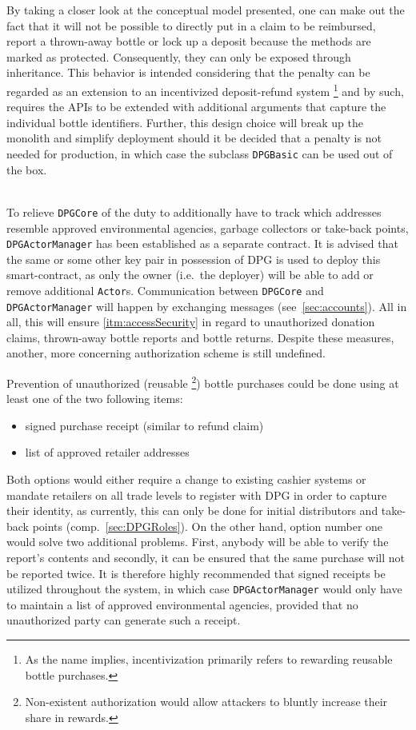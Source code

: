 \begin{description}[format={\storedescriptionlabel}]
	By taking a closer look at the conceptual model presented, one can make out the fact that it will not be possible to directly put in a claim to be reimbursed, report a thrown-away bottle or lock up a deposit because the methods are marked as protected. Consequently, they can only be exposed through inheritance. This behavior is intended considering that the penalty can be regarded as an extension to an incentivized deposit-refund system \footnote{As the name implies, incentivization primarily refers to rewarding reusable bottle purchases.} and by such, requires the \acsp{API} to be extended with additional arguments that capture the individual bottle identifiers. Further, this design choice will break up the monolith and simplify deployment should it be decided that a penalty is not needed for production, in which case the subclass \texttt{DPGBasic} can be used out of the box.
	\item[Access Control\label{itm:accessControl}]
	\hfill \\
	To relieve \texttt{DPGCore} of the duty to additionally have to track which addresses resemble approved environmental agencies, garbage collectors or take-back points, \texttt{DPGActorManager} has been established as a separate contract. It is advised that the same or some other key pair in possession of \ac{DPG} is used to deploy this smart-contract, as only the owner (i.e.~the deployer) will be able to add or remove additional \texttt{Actor}s. Communication between \texttt{DPGCore} and \texttt{DPGActorManager} will happen by exchanging messages (see~\ref{sec:accounts}). All in all, this will ensure \ref{itm:accessSecurity} in regard to unauthorized donation claims, thrown-away bottle reports and bottle returns. Despite these measures, another, more concerning authorization scheme is still undefined. 
	
	Prevention of unauthorized (reusable \footnote{Non-existent authorization would allow attackers to bluntly increase their share in rewards.}) bottle purchases could be done using at least one of the two following items:
	
	\begin{itemize}
  		\item signed purchase receipt (similar to refund claim)
  		\item list of approved retailer addresses
	\end{itemize}

	Both options would either require a change to existing cashier systems or mandate retailers on all trade levels to register with \ac{DPG} in order to capture their identity, as currently, this can only be done for initial distributors and take-back points (comp.~\ref{sec:DPGRoles}). On the other hand, option number one would solve two additional problems. First, anybody will be able to verify the report's contents and secondly, it can be ensured that the same purchase will not be reported twice. It is therefore highly recommended that signed receipts be utilized throughout the system, in which case \texttt{DPGActorManager} would only have to maintain a list of approved environmental agencies, provided that no unauthorized party can generate such a receipt.
	

\end{description}
